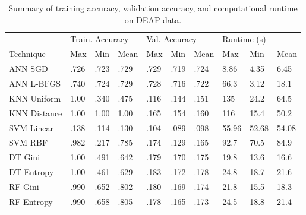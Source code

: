 \documentclass[12pt]{uthesis-v12}  %
\begin{document}
\begin{table}[!t]
\caption{Summary of training accuracy, validation accuracy, and computational runtime on DEAP data.}
\renewcommand{\arraystretch}{1.3}
\centering
{\begin{tabular}{*{10}{l}}
\toprule
& \multicolumn{3}{l}{Train. Accuracy} & \multicolumn{3}{l}{Val. Accuracy} & \multicolumn{3}{l}{Runtime (s)} \\
Technique & Max & Min & Mean & Max & Min & Mean & Max & Min & Mean \\ \midrule
ANN SGD & .726 & .723 & .729 & .729 & .719 & .724 & 8.86 & 4.35 & 6.45 \\
ANN L-BFGS & .740 & .724 & .729 & .728 & .716 & .722 & 66.3 & 3.12 & 18.1 \\
KNN Uniform & 1.00 & .340 & .475 & .116 & .144 & .151 & 135 & 24.2 & 64.5 \\
KNN Distance & 1.00 & 1.00 & 1.00 & .165 & .154 & .160 & 116 & 15.4 & 50.2 \\
SVM Linear & .138 & .114 & .130 & .104 & .089 & .098 & 55.96 & 52.68 & 54.08 \\
SVM RBF & .982 & .217 & .785 & .174 & .129 & .165 & 92.7 & 70.5 & 84.9 \\
DT Gini & 1.00 & .491 & .642 & .179 & .170 & .175 & 19.8 & 13.6 & 16.6 \\
DT Entropy & 1.00 & .461 & .629 & .183 & .172 & .178 & 24.8 & 18.7 & 21.6 \\
RF Gini & .990 & .652 & .802 & .180 & .169 & .174 & 21.8 & 15.5 & 18.3 \\
RF Entropy & .990 & .658 & .805 & .178 & .165 & .173 & 24.5 & 18.8 & 21.4 \\ \bottomrule
\end{tabular}}

\label{tvr-deap}
\end{table}
\end{document}
